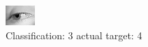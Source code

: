 \begin{figure}[h!]
\begin{center}
\includegraphics[width=0.60\columnwidth]{figures/ID3031_class_3_target_4.png}
\end{center}
\caption{ Classification: 3 actual target: 4}
\label{fig:ID3031_class_3_target_4}
\end{figure}
